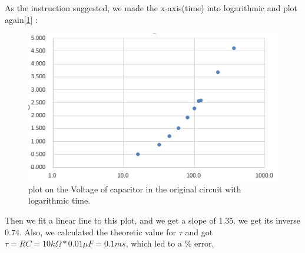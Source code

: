 \phantom{ } As the instruction suggested, we made the x-axis(time) into logarithmic and plot again[\ref{fig:2.2}] :\\
\begin{figure}[htbp]
	\centering %
	\includegraphics[width=\linewidth]{images/2_2.PNG} %
	\caption{plot on the Voltage of capacitor in the original circuit with logarithmic time.} %
	\label{fig:2.2} %
\end{figure}
\phantom{ } Then we fit a linear line to this plot, and we get a slope of 1.35.
we get its inverse 0.74. Also, we calculated the theoretic value for $\tau$ and got\\
$\tau = RC = 10k\Omega * 0.01\mu F = 0.1ms$, which led to a \% error.
